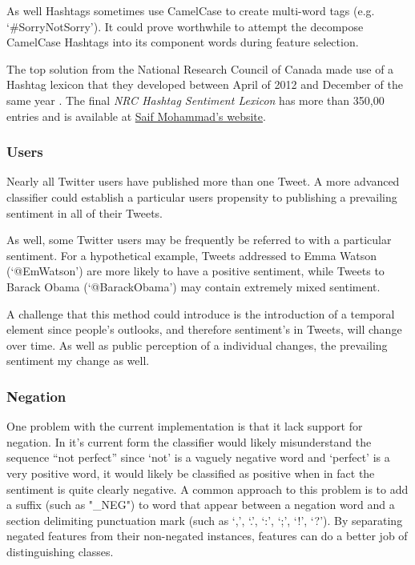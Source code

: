 \documentclass[final,3p,12pt]{elsarticle}
\begin{document}
As well Hashtags sometimes use CamelCase to create multi-word tags (e.g.
`\#SorryNotSorry'). It could prove worthwhile to attempt the decompose
CamelCase Hashtags into its component words during feature selection.

The top solution from the National Research Council of Canada made use of a
Hashtag lexicon that they developed between April of 2012 and December of the
same year \cite{Mohammad2013}. The final \textit{NRC Hashtag Sentiment Lexicon}
has more than 350,00 entries and is available at
\href{http://www.saifmohammad.com/WebDocs/NRC-Hashtag-Sentiment-Lexicon-v0.1.zip}{Saif
Mohammad's website}.

\subsubsection{Users}
\label{sssection:users}

Nearly all Twitter users have published more than one Tweet. A more advanced
classifier could establish a particular users propensity to publishing a
prevailing sentiment in all of their Tweets.

As well, some Twitter users may be frequently be referred to with a particular
sentiment. For a hypothetical example, Tweets addressed to Emma Watson
(`@EmWatson') are more likely to have a positive sentiment, while Tweets to
Barack Obama (`@BarackObama') may contain extremely mixed sentiment.

A challenge that this method could introduce is the introduction of a temporal
element since people's outlooks, and therefore sentiment's in Tweets, will
change over time. As well as public perception of a individual changes, the
prevailing sentiment my change as well.

\subsubsection{Negation}
\label{sssection:negation}

One problem with the current implementation is that it lack support for
negation. In it's current form the classifier would likely misunderstand the
sequence ``not perfect'' since `not' is a vaguely negative word and `perfect'
is a very positive word, it would likely be classified as positive when in fact
the sentiment is quite clearly negative. A common approach to this problem is
to add a suffix (such as "\_NEG") to word that appear between a negation word
and a section delimiting punctuation mark (such as `,', `.', `:', `;', `!',
`?'). By separating negated features from their non-negated instances, features
can do a better job of distinguishing classes.
\end{document}
